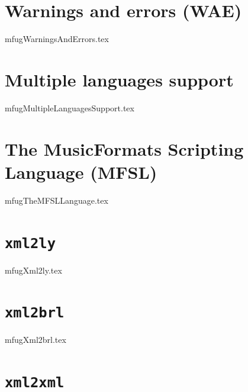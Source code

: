 \documentclass[11pt,a4paper]{report}
\begin{document}
\part{Warnings and errors (WAE)}

{mfugWarningsAndErrors.tex}


\part{Multiple languages support}

{mfugMultipleLanguagesSupport.tex}


\part{The MusicFormats Scripting Language (MFSL)}

{mfugTheMFSLLanguage.tex}


\part{{\tt xml2ly}}

{mfugXml2ly.tex}


\part{{\tt xml2brl}}

{mfugXml2brl.tex}


\part{{\tt xml2xml}}
\end{document}
